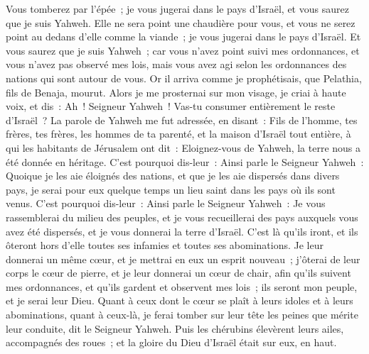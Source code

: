 \begin{multicols}{2}
Vous tomberez par l'épée~; je vous jugerai dans le pays d'Israël, et vous saurez que je suis Yahweh.
Elle ne sera point une chaudière pour vous, et vous ne serez point au dedans d'elle comme la viande~; je vous jugerai dans le pays d'Israël.
Et vous saurez que je suis Yahweh~; car vous n'avez point suivi mes ordonnances, et vous n'avez pas observé mes lois, mais vous avez agi selon les ordonnances des nations qui sont autour de vous.
Or il arriva comme je prophétisais, que Pelathia, fils de Benaja, mourut. Alors je me prosternai sur mon visage, je criai à haute voix, et dis~: Ah~! Seigneur Yahweh~! Vas-tu consumer entièrement le reste d'Israël~?
La parole de Yahweh me fut adressée, en disant~:
Fils de l'homme, tes frères, tes frères, les hommes de ta parenté, et la maison d'Israël tout entière, à qui les habitants de Jérusalem ont dit~: Eloignez-vous de Yahweh, la terre nous a été donnée en héritage.
C'est pourquoi dis-leur~: Ainsi parle le Seigneur Yahweh~: Quoique je les aie éloignés des nations, et que je les aie dispersés dans divers pays, je serai pour eux quelque temps un lieu saint dans les pays où ils sont venus.
C'est pourquoi dis-leur~: Ainsi parle le Seigneur Yahweh~: Je vous rassemblerai du milieu des peuples, et je vous recueillerai des pays auxquels vous avez été dispersés, et je vous donnerai la terre d'Israël.
C'est là qu'ils iront, et ils ôteront hors d'elle toutes ses infamies et toutes ses abominations.
Je leur donnerai un même cœur, et je mettrai en eux un esprit nouveau~; j'ôterai de leur corps le cœur de pierre, et je leur donnerai un cœur de chair,
afin qu'ils suivent mes ordonnances, et qu'ils gardent et observent mes lois~; ils seront mon peuple, et je serai leur Dieu.
Quant à ceux dont le cœur se plaît à leurs idoles et à leurs abominations, quant à ceux-là, je ferai tomber sur leur tête les peines que mérite leur conduite, dit le Seigneur Yahweh.
Puis les chérubins élevèrent leurs ailes, accompagnés des roues~; et la gloire du Dieu d'Israël était sur eux, en haut.

\end{multicols}
